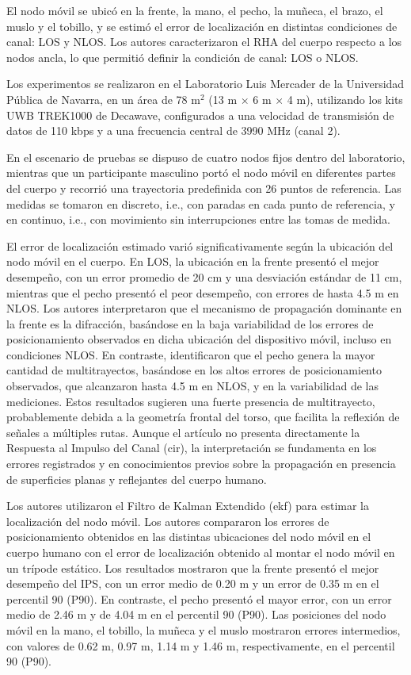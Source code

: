 \begin{enumerate}
    El nodo móvil se ubicó en la frente, la mano, el pecho, la muñeca, el brazo, el muslo y el tobillo, y se estimó el error de localización en distintas condiciones de canal: LOS y NLOS. Los autores caracterizaron el RHA del cuerpo respecto a los nodos ancla, lo que permitió definir la condición de canal: LOS o NLOS. 
    
    Los experimentos se realizaron en el Laboratorio Luis Mercader de la Universidad Pública de Navarra, en un área de 78 m$^2$ (13 m $\times$ 6 m $\times$ 4 m), utilizando los kits UWB TREK1000 de Decawave, configurados a una velocidad de transmisión de datos de 110 kbps y a una frecuencia central de 3990 MHz (canal 2). 
    
    En el escenario de pruebas se dispuso de cuatro nodos fijos dentro del laboratorio, mientras que un participante masculino portó el nodo móvil en diferentes partes del cuerpo y recorrió una trayectoria predefinida con 26 puntos de referencia. Las medidas se tomaron en discreto, i.e., con paradas en cada punto de referencia, y en continuo, i.e., con movimiento sin interrupciones entre las tomas de medida.

    El error de localización estimado varió significativamente según la ubicación del nodo móvil en el cuerpo. En LOS, la ubicación en la frente presentó el mejor desempeño, con un error promedio de 20 cm y una desviación estándar de 11 cm, mientras que el pecho presentó el peor desempeño, con errores de hasta 4.5 m en NLOS. Los autores interpretaron que el mecanismo de propagación dominante en la frente es la difracción, basándose en la baja variabilidad de los errores de posicionamiento observados en dicha ubicación del dispositivo móvil, incluso en condiciones NLOS. En contraste, identificaron que el pecho genera la mayor cantidad de multitrayectos, basándose en los altos errores de posicionamiento observados, que alcanzaron hasta 4.5 m en NLOS, y en la variabilidad de las mediciones. Estos resultados sugieren una fuerte presencia de multitrayecto, probablemente debida a la geometría frontal del torso, que facilita la reflexión de señales a múltiples rutas. Aunque el artículo no presenta directamente la Respuesta al Impulso del Canal (\gls{cir}), la interpretación se fundamenta en los errores registrados y en conocimientos previos sobre la propagación en presencia de superficies planas y reflejantes del cuerpo humano.
    
    Los autores utilizaron el Filtro de Kalman Extendido (\gls{ekf}) para estimar la localización del nodo móvil. Los autores compararon los errores de posicionamiento obtenidos en las distintas ubicaciones del nodo móvil en el cuerpo humano con el error de localización obtenido al montar el nodo móvil en un trípode estático. Los resultados mostraron que la frente presentó el mejor desempeño del IPS, con un error medio de 0.20 m y un error de 0.35 m en el percentil 90 (P90). En contraste, el pecho presentó el mayor error, con un error medio de 2.46 m y de 4.04 m en el percentil 90 (P90). Las posiciones del nodo móvil en la mano, el tobillo, la muñeca y el muslo mostraron errores intermedios, con valores de 0.62 m, 0.97 m, 1.14 m y 1.46 m, respectivamente, en el percentil 90 (P90). 
    

\end{enumerate}

